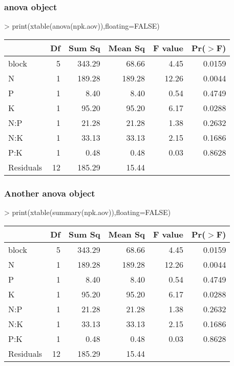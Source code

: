 \documentclass[letterpaper]{article}
\begin{document}
\subsubsection{anova object}
\begin{Schunk}
\begin{Sinput}
> print(xtable(anova(npk.aov)),floating=FALSE)
\end{Sinput}
% latex table generated in R 3.1.1 by xtable 1.7-3 package
% 
\begin{tabular}{lrrrrr}
  \hline
 & Df & Sum Sq & Mean Sq & F value & Pr($>$F) \\ 
  \hline
block & 5 & 343.29 & 68.66 & 4.45 & 0.0159 \\ 
  N & 1 & 189.28 & 189.28 & 12.26 & 0.0044 \\ 
  P & 1 & 8.40 & 8.40 & 0.54 & 0.4749 \\ 
  K & 1 & 95.20 & 95.20 & 6.17 & 0.0288 \\ 
  N:P & 1 & 21.28 & 21.28 & 1.38 & 0.2632 \\ 
  N:K & 1 & 33.13 & 33.13 & 2.15 & 0.1686 \\ 
  P:K & 1 & 0.48 & 0.48 & 0.03 & 0.8628 \\ 
  Residuals & 12 & 185.29 & 15.44 &  &  \\ 
   \hline
\end{tabular}\end{Schunk}

\subsubsection{Another anova object}
\begin{Schunk}
\begin{Sinput}
> print(xtable(summary(npk.aov)),floating=FALSE)
\end{Sinput}
% latex table generated in R 3.1.1 by xtable 1.7-3 package
% 
\begin{tabular}{lrrrrr}
  \hline
 & Df & Sum Sq & Mean Sq & F value & Pr($>$F) \\ 
  \hline
block       & 5 & 343.29 & 68.66 & 4.45 & 0.0159 \\ 
  N           & 1 & 189.28 & 189.28 & 12.26 & 0.0044 \\ 
  P           & 1 & 8.40 & 8.40 & 0.54 & 0.4749 \\ 
  K           & 1 & 95.20 & 95.20 & 6.17 & 0.0288 \\ 
  N:P         & 1 & 21.28 & 21.28 & 1.38 & 0.2632 \\ 
  N:K         & 1 & 33.13 & 33.13 & 2.15 & 0.1686 \\ 
  P:K         & 1 & 0.48 & 0.48 & 0.03 & 0.8628 \\ 
  Residuals   & 12 & 185.29 & 15.44 &  &  \\ 
   \hline
\end{tabular}\end{Schunk}
\end{document}
